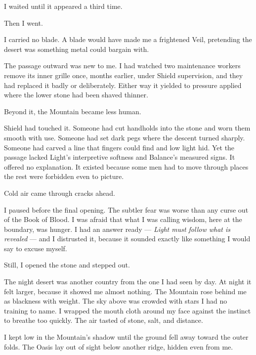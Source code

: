 I waited until it appeared a third time.\par

Then I went.\par

I carried no blade. A blade would have made me a frightened Veil, pretending the desert was something metal could bargain with.\par

The passage outward was new to me. I had watched two maintenance workers remove its inner grille once, months earlier, under Shield supervision, and they had replaced it badly or deliberately. Either way it yielded to pressure applied where the lower stone had been shaved thinner.\par

Beyond it, the Mountain became less human.\par

Shield had touched it. Someone had cut handholds into the stone and worn them smooth with use. Someone had set dark pegs where the descent turned sharply. Someone had carved a line that fingers could find and low light hid. Yet the passage lacked Light's interpretive softness and Balance's measured signs. It offered no explanation. It existed because some men had to move through places the rest were forbidden even to picture.\par

Cold air came through cracks ahead.\par

I paused before the final opening. The subtler fear was worse than any curse out of the Book of Blood. I was afraid that what I was calling wisdom, here at the boundary, was hunger. I had an answer ready --- \textit{Light must follow what is revealed} --- and I distrusted it, because it sounded exactly like something I would say to excuse myself.\par

Still, I opened the stone and stepped out.\par

The night desert was another country from the one I had seen by day. At night it felt larger, because it showed me almost nothing. The Mountain rose behind me as blackness with weight. The sky above was crowded with stars I had no training to name. I wrapped the mouth cloth around my face against the instinct to breathe too quickly. The air tasted of stone, salt, and distance.\par

I kept low in the Mountain's shadow until the ground fell away toward the outer folds. The Oasis lay out of sight below another ridge, hidden even from me.\par

